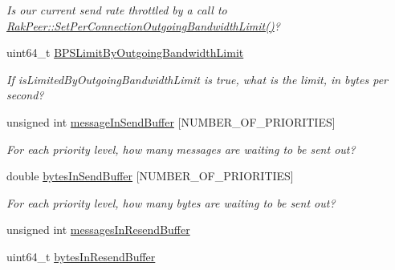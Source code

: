 \begin{DoxyCompactItemize}
\begin{DoxyCompactList}\small\item\em Is our current send rate throttled by a call to \hyperlink{class_rak_net_1_1_rak_peer_a9c67c61c6eebed7a4ed8bc2ea2813b56}{Rak\-Peer\-::\-Set\-Per\-Connection\-Outgoing\-Bandwidth\-Limit()}? \end{DoxyCompactList}\item 
\hypertarget{struct_rak_net_1_1_rak_net_statistics_ac26fb5ed5e4352d958d6a06ddbb82138}{uint64\-\_\-t \hyperlink{struct_rak_net_1_1_rak_net_statistics_ac26fb5ed5e4352d958d6a06ddbb82138}{B\-P\-S\-Limit\-By\-Outgoing\-Bandwidth\-Limit}}\label{struct_rak_net_1_1_rak_net_statistics_ac26fb5ed5e4352d958d6a06ddbb82138}

\begin{DoxyCompactList}\small\item\em If {\itshape is\-Limited\-By\-Outgoing\-Bandwidth\-Limit} is true, what is the limit, in bytes per second? \end{DoxyCompactList}\item 
\hypertarget{struct_rak_net_1_1_rak_net_statistics_a437086be4e5d907f72de273aa8d50e0f}{unsigned int \hyperlink{struct_rak_net_1_1_rak_net_statistics_a437086be4e5d907f72de273aa8d50e0f}{message\-In\-Send\-Buffer} \mbox{[}N\-U\-M\-B\-E\-R\-\_\-\-O\-F\-\_\-\-P\-R\-I\-O\-R\-I\-T\-I\-E\-S\mbox{]}}\label{struct_rak_net_1_1_rak_net_statistics_a437086be4e5d907f72de273aa8d50e0f}

\begin{DoxyCompactList}\small\item\em For each priority level, how many messages are waiting to be sent out? \end{DoxyCompactList}\item 
\hypertarget{struct_rak_net_1_1_rak_net_statistics_aaba55c95f5ea9698068f3fdae9ec7604}{double \hyperlink{struct_rak_net_1_1_rak_net_statistics_aaba55c95f5ea9698068f3fdae9ec7604}{bytes\-In\-Send\-Buffer} \mbox{[}N\-U\-M\-B\-E\-R\-\_\-\-O\-F\-\_\-\-P\-R\-I\-O\-R\-I\-T\-I\-E\-S\mbox{]}}\label{struct_rak_net_1_1_rak_net_statistics_aaba55c95f5ea9698068f3fdae9ec7604}

\begin{DoxyCompactList}\small\item\em For each priority level, how many bytes are waiting to be sent out? \end{DoxyCompactList}\item 
unsigned int \hyperlink{struct_rak_net_1_1_rak_net_statistics_a6afad117322d397a65bccf2475e42d04}{messages\-In\-Resend\-Buffer}
\item 
\hypertarget{struct_rak_net_1_1_rak_net_statistics_a58f50bb872e04f31946b3571ab548446}{uint64\-\_\-t \hyperlink{struct_rak_net_1_1_rak_net_statistics_a58f50bb872e04f31946b3571ab548446}{bytes\-In\-Resend\-Buffer}}\label{struct_rak_net_1_1_rak_net_statistics_a58f50bb872e04f31946b3571ab548446}


\end{DoxyCompactItemize}
